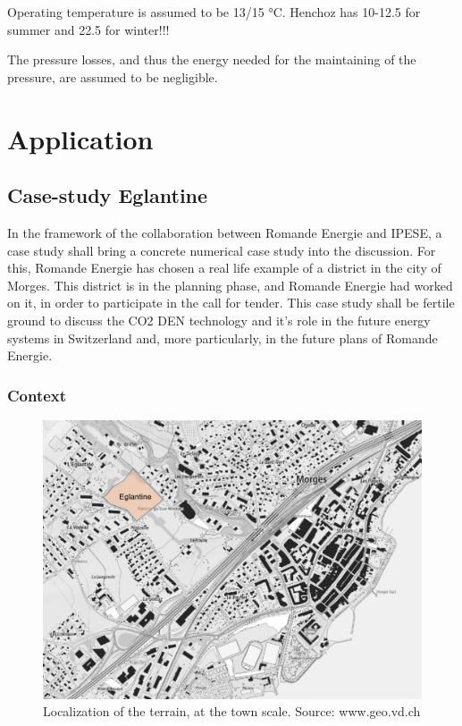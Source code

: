 \documentclass{article}
\begin{document}
Operating temperature is assumed to be 13/15 \si{\celsius}.
Henchoz\cite{henchozPotentialRefrigerantBased} has 10-12.5 for summer and 22.5 for winter!!! 

The pressure losses, and thus the energy needed for the maintaining of the pressure, are assumed to be negligible.


\section{Application}

\subsection{Case-study Eglantine}\label{ss:Eglantine}
In the framework of the collaboration between Romande Energie and IPESE, a case study shall bring a concrete numerical case study into the discussion. For this, Romande Energie has chosen a real life example of a district in the city of Morges. This district is in the planning phase, and Romande Energie had worked on it, in order to participate in the call for tender. This case study shall be fertile ground to discuss the CO2 DEN technology and it's role in the future energy systems in Switzerland and, more particularly, in the future plans of Romande Energie.

\subsubsection{Context}

\begin{figure}[htp]
\centering
\includegraphics[width=1\textwidth]{morges.png}
\caption{Localization of the terrain, at the town scale. Source: www.geo.vd.ch}
\label{fig:morges}
\end{figure}
\end{document}
